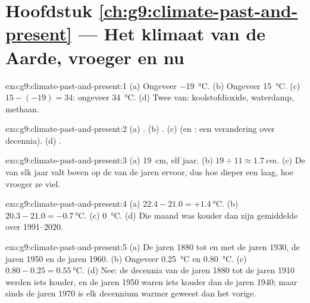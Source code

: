 \section*{Hoofdstuk \ref{ch:g9:climate-past-and-present} --- Het klimaat van de Aarde, vroeger en nu}

\begin{solution}{exo:g9:climate-past-and-present:1}
(a) Ongeveer \qty{-19}{\degreeCelsius}. (b) Ongeveer \qty{15}{\degreeCelsius}.
(c) $15 - (-19) = 34$: ongeveer \qty{34}{\degreeCelsius}. (d) Twee van:
koolstofdioxide, waterdamp, methaan.
\end{solution}

\begin{solution}{exo:g9:climate-past-and-present:2}
(a) . (b) . (c)  (en : een verandering
over decennia). (d) .
\end{solution}

\begin{solution}{exo:g9:climate-past-and-present:3}
(a) \qty{19}{cm}, elf jaar. (b) $19 \div 11 \approx \qty{1.7}{cm}$.
(c) De  van elk jaar valt boven op de  van de jaren ervoor,
dus hoe dieper een laag, hoe vroeger ze viel.
\end{solution}

\begin{solution}{exo:g9:climate-past-and-present:4}
(a) $22.4 - 21.0 = +\qty{1.4}{\degreeCelsius}$. (b) $20.3 - 21.0 =
\qty{-0.7}{\degreeCelsius}$. (c) \qty{0}{\degreeCelsius}. (d) Die maand
was kouder dan zijn gemiddelde over 1991--2020.
\end{solution}

\begin{solution}{exo:g9:climate-past-and-present:5}
(a) De jaren 1880 tot en met de jaren 1930, de jaren 1950 en de jaren
1960. (b) Ongeveer \qty{0.25}{\degreeCelsius} en
\qty{0.80}{\degreeCelsius}. (c) $0.80 -
0.25 = \qty{0.55}{\degreeCelsius}$. (d) Nee: de decennia van de jaren 1880
tot de jaren 1910 werden iets kouder, en de jaren 1950 waren iets kouder
dan de jaren 1940; maar sinds de jaren 1970 is elk decennium warmer
geweest dan het vorige.
\end{solution}

